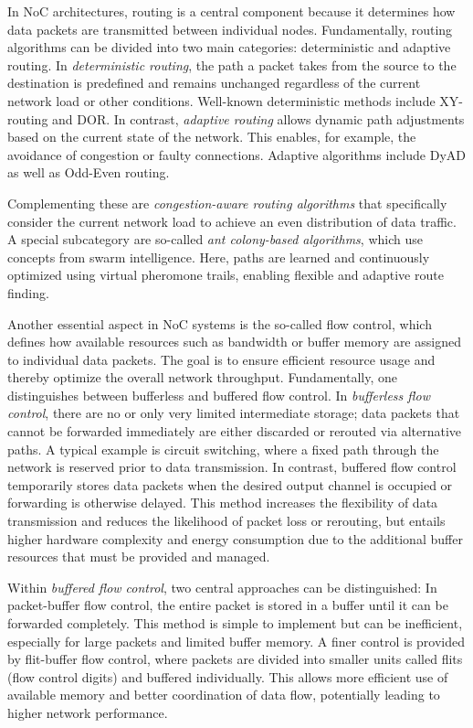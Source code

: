 In \ac{NoC} architectures, routing is a central component because it determines how data packets are transmitted between individual nodes. Fundamentally, routing algorithms can be divided into two main categories: deterministic and adaptive routing. In \textit{deterministic routing}, the path a packet takes from the source to the destination is predefined and remains unchanged regardless of the current network load or other conditions. Well-known deterministic methods include XY-routing and \ac{DOR}.\cite{ma_summary_2024} In contrast, \textit{adaptive routing} allows dynamic path adjustments based on the current state of the network. This enables, for example, the avoidance of congestion or faulty connections. Adaptive algorithms include \ac{DyAD}\cite{hu_dyad_2004} as well as Odd-Even routing.

Complementing these are \textit{congestion-aware routing algorithms} that specifically consider the current network load to achieve an even distribution of data traffic.\cite{fang_parrouting_2020} A special subcategory are so-called \textit{ant colony-based algorithms}, which use concepts from swarm intelligence. Here, paths are learned and continuously optimized using virtual pheromone trails, enabling flexible and adaptive route finding.\cite{luneque_routing_2013}


Another essential aspect in \ac{NoC} systems is the so-called flow control, which defines how available resources such as bandwidth or buffer memory are assigned to individual data packets. The goal is to ensure efficient resource usage and thereby optimize the overall network throughput. Fundamentally, one distinguishes between bufferless and buffered flow control. In \textit{bufferless flow control}, there are no or only very limited intermediate storage; data packets that cannot be forwarded immediately are either discarded or rerouted via alternative paths. A typical example is circuit switching, where a fixed path through the network is reserved prior to data transmission. In contrast, buffered flow control temporarily stores data packets when the desired output channel is occupied or forwarding is otherwise delayed. This method increases the flexibility of data transmission and reduces the likelihood of packet loss or rerouting, but entails higher hardware complexity and energy consumption due to the additional buffer resources that must be provided and managed.

Within \textit{buffered flow control}, two central approaches can be distinguished: In packet-buffer flow control, the entire packet is stored in a buffer until it can be forwarded completely. This method is simple to implement but can be inefficient, especially for large packets and limited buffer memory. A finer control is provided by flit-buffer flow control, where packets are divided into smaller units called flits (flow control digits) and buffered individually. This allows more efficient use of available memory and better coordination of data flow, potentially leading to higher network performance.

